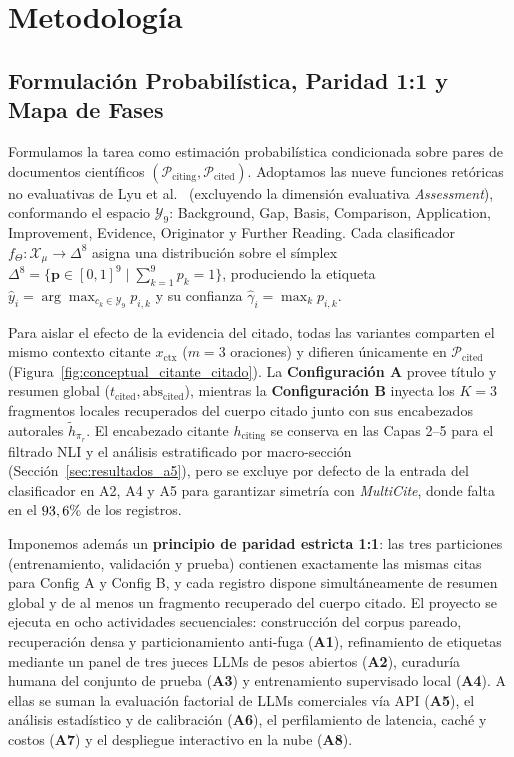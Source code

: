 \documentclass[conference]{IEEEtran}
\newcommand{\pct}{\mbox{\symbol{37}}}
\begin{document}
\section{Metodología}

\subsection{Formulación Probabilística, Paridad 1:1 y Mapa de Fases}

Formulamos la tarea como estimación probabilística condicionada sobre pares de documentos científicos $(\mathcal{P}_{\text{citing}}, \mathcal{P}_{\text{cited}})$. Adoptamos las nueve funciones retóricas no evaluativas de Lyu et al.~\cite{lyu2021classification} (excluyendo la dimensión evaluativa \textit{Assessment}), conformando el espacio $\mathcal{Y}_9$: Background, Gap, Basis, Comparison, Application, Improvement, Evidence, Originator y Further Reading. Cada clasificador $f_\Theta: \mathcal{X}_\mu \to \Delta^8$ asigna una distribución sobre el símplex $\Delta^8 = \{ \mathbf{p} \in [0, 1]^9 \mid \sum_{k=1}^{9} p_k = 1 \}$, produciendo la etiqueta $\hat{y}_i = \arg\max_{c_k \in \mathcal{Y}_9} p_{i,k}$ y su confianza $\hat{\gamma}_i = \max_k p_{i,k}$.

Para aislar el efecto de la evidencia del citado, todas las variantes comparten el mismo contexto citante $x_{\text{ctx}}$ ($m=3$ oraciones) y difieren únicamente en $\mathcal{P}_{\text{cited}}$ (Figura~\ref{fig:conceptual_citante_citado}). La \textbf{Configuración A} provee título y resumen global ($t_{\text{cited}}, \text{abs}_{\text{cited}}$), mientras la \textbf{Configuración B} inyecta los $K=3$ fragmentos locales recuperados del cuerpo citado junto con sus encabezados autorales $\tilde{h}_{\pi_r}$. El encabezado citante $h_{\text{citing}}$ se conserva en las Capas 2--5 para el filtrado NLI y el análisis estratificado por macro-sección (Sección~\ref{sec:resultados_a5}), pero se excluye por defecto de la entrada del clasificador en A2, A4 y A5 para garantizar simetría con \textit{MultiCite}, donde falta en el $93,6\pct{}$ de los registros.

Imponemos además un \textbf{principio de paridad estricta 1:1}: las tres particiones (entrenamiento, validación y prueba) contienen exactamente las mismas citas para Config A y Config B, y cada registro dispone simultáneamente de resumen global y de al menos un fragmento recuperado del cuerpo citado.
El proyecto se ejecuta en ocho actividades secuenciales: construcción del corpus pareado, recuperación densa y particionamiento anti-fuga (\textbf{A1}), refinamiento de etiquetas mediante un panel de tres jueces LLMs de pesos abiertos (\textbf{A2}), curaduría humana del conjunto de prueba (\textbf{A3}) y entrenamiento supervisado local (\textbf{A4}). A ellas se suman la evaluación factorial de LLMs comerciales vía API (\textbf{A5}), el análisis estadístico y de calibración (\textbf{A6}), el perfilamiento de latencia, caché y costos (\textbf{A7}) y el despliegue interactivo en la nube (\textbf{A8}).
\end{document}
